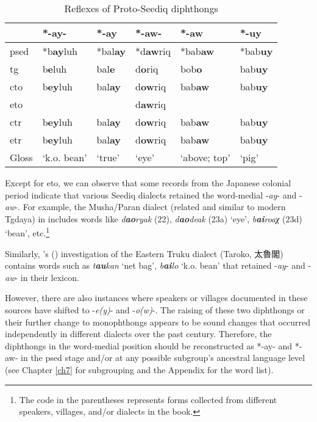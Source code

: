 \begin{table}[!htbp]
\centering
\caption{Reflexes of Proto-Seediq diphthongs}
\label{tab:psed_VV}
\begin{tabular}{llllll}\hline
           & *-ay-       & *-ay   & *-aw-   & *-aw         & *-uy   \\ \hline
\acs{psed} & *b\textbf{ay}luh     & *bal\textbf{ay} & *d\textbf{aw}riq & *bab\textbf{aw}       & *bab\textbf{uy} \\ \hdashline
\acs{tg}   & b\textbf{e}luh       & bal\textbf{e}   & d\textbf{o}riq   & bob\textbf{o}         & bab\textbf{uy}  \\
\acs{cto}  & b\textbf{ey}luh      & bal\textbf{ay}  & d\textbf{ow}riq  & bab\textbf{aw}        & bab\textbf{uy}  \\
\acs{eto}  &             &        & d\textbf{aw}riq  &              &        \\
\acs{ctr}  & b\textbf{ey}luh      & bal\textbf{ay}  & d\textbf{ow}riq  & bab\textbf{aw}        & bab\textbf{uy}  \\
\acs{etr}  & b\textbf{ey}luh      & bal\textbf{ay}  & d\textbf{ow}riq  & bab\textbf{aw}        & bab\textbf{uy}  \\ \hline
Gloss      & `k.o. bean' & `true' & `eye'   & `above; top' & `pig' 
\\ \hline
\end{tabular}
\end{table}

Except for \acl{eto}, we can observe that some records from the Japanese colonial period indicate that various Seediq dialects retained the word-medial -\textit{ay}- and -\textit{aw}-. For example, the Musha/Paran dialect (related and similar to modern Tgdaya) in \textcite{ogawa2006voc} includes words like \textit{d\textbf{ao}ryak} (22), \textit{d\textbf{ao}deak} (23a) `eye', \textit{b\textbf{ai}roaχ} (23d) `bean', etc.\footnote{The code in the parentheses represents forms collected from different speakers, villages, and/or dialects in the book.} 

Similarly, \citeauthor{tashiro1900easterntw}'s (\citeyear{tashiro1900easterntw}) investigation of the Eastern Truku dialect (Taroko, 太魯閣) contains words such as \textit{t\textbf{au}kan} `net bag', \textit{b\textbf{ai}lo} `k.o. bean' that retained -\textit{ay}- and -\textit{aw}- in their lexicon. 

However, there are also instances where speakers or villages documented in these sources have shifted to -\textit{e(y)}- and -\textit{o(w)}-. The raising of these two diphthongs or their further change to monophthongs appears to be sound changes that occurred independently in different dialects over the past century. Therefore, the diphthongs in the word-medial position should be reconstructed as *-ay- and *-aw- in the \acl{psed} stage and/or at any possible subgroup's ancestral language level (see Chapter \ref{ch7} for subgrouping and the Appendix for the word list).

